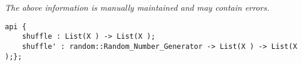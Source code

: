 \label{api:List\_Shuffle}

{\tiny \it The above information is manually maintained and may contain errors.}
\begin{verbatim}
api {
    shuffle : List(X ) -> List(X );
    shuffle' : random::Random_Number_Generator -> List(X ) -> List(X );};
\end{verbatim}
